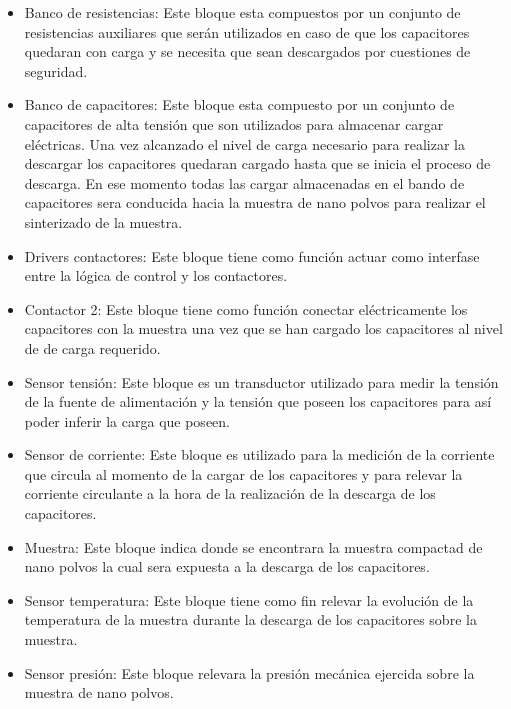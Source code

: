 \documentclass[12pt]{article}
\begin{document}
\begin{itemize}
    \item Banco de resistencias: Este bloque esta compuestos por un conjunto de resistencias auxiliares que serán utilizados en caso de que los capacitores quedaran
			   con carga y se necesita que sean descargados por cuestiones de seguridad.

    \item Banco de capacitores: Este bloque esta compuesto por un conjunto de capacitores de alta tensión que son utilizados para almacenar cargar eléctricas.
				Una vez alcanzado el nivel de carga necesario para realizar la descargar los capacitores quedaran cargado hasta que se inicia el 
				proceso de descarga. En ese momento todas las cargar almacenadas en el bando de capacitores sera conducida hacia la muestra 
				de nano polvos para realizar el sinterizado de la muestra.
				
    \item Drivers contactores: Este bloque tiene como función actuar como interfase entre la lógica de control y los contactores.

    \item Contactor 2: Este bloque tiene como función conectar eléctricamente los capacitores con la muestra una vez que se han cargado los capacitores al nivel de
			de carga requerido.

    \item Sensor tensión: Este bloque es un transductor utilizado para medir la tensión de la fuente de alimentación y la tensión que poseen los capacitores para 
			    así poder inferir la carga que poseen. 
    
    \item Sensor de corriente: Este bloque es utilizado para la medición de la corriente que circula al momento de la cargar de los capacitores y para relevar la
			      corriente circulante a la hora de la realización de la descarga de los capacitores.

    \item Muestra: Este bloque indica donde se encontrara la muestra compactad de nano polvos la cual sera expuesta a la descarga de los capacitores.

    \item Sensor temperatura: Este bloque tiene como fin relevar la evolución de la temperatura de la muestra durante la descarga de los capacitores sobre la muestra.

    \item Sensor presión: Este bloque relevara la presión mecánica ejercida sobre la muestra de nano polvos.
    

\end{itemize}
\end{document}
